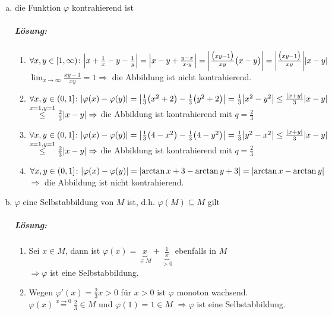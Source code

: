 \documentclass{scrreprt}
\begin{document}
\begin{enumerate}[a)]
\item die Funktion $\varphi$ kontrahierend ist

  \subparagraph{Lösung:}
  \begin{enumerate}[(1)]
  \label{sec:1_a_1}
  \item $\forall x, y \in [1, \infty) \colon \abs{x + \frac{1}{x} - y - \frac{1}{y}}
    = \abs{x - y + \frac{y - x}{x \cdot y}}
    = \abs{\frac{\qty\big(xy - 1)}{xy} \qty\big(x - y)}
    = \abs{\frac{\qty\big(xy - 1)}{xy}} \abs{x - y}$
    $\lim_{x \to \infty}\frac{xy - 1}{xy} = 1 \Rightarrow$ die Abbildung ist nicht kontrahierend.

  \item $\forall x, y \in (0, 1] \colon \abs{\varphi(x) - \varphi(y)}
    = \abs{\frac{1}{3}\qty\big(x^2 + 2) - \frac{1}{3}\qty\big(y^2 + 2)}
    = \frac{1}{3}\abs{x^2 - y^2}
    \leq \frac{\abs{x + y}}{3}\abs{x - y}$
    $\overset{x = 1, y = 1} \leq \frac{2}{3}\abs{x - y}
    \Rightarrow$ die Abbildung ist kontrahierend mit
    $q = \frac{2}{3}$

  \label{sec:1_a_3}
  \item $\forall x, y \in (0, 1] \colon \abs{\varphi(x) - \varphi(y)}
    = \abs{\frac{1}{3}\qty\big(4 - x^2) - \frac{1}{3}\qty\big(4 - y^2)}
    = \frac{1}{3}\abs{y^2 - x^2}
    \leq \frac{\abs{x + y}}{3}\abs{x - y}$
    $\overset{x = 1, y = 1} \leq \frac{2}{3}\abs{x - y}
    \Rightarrow$ die Abbildung ist kontrahierend mit
    $q = \frac{2}{3}$

  \label{sec:1_a_4}
  \item $\forall x, y \in (0, 1] \colon \abs{\varphi(x) - \varphi(y)}
    = \abs{\arctan x + 3 - \arctan y + 3} = \abs{\arctan x - \arctan y}$
    $\Rightarrow$ die Abbildung ist nicht kontrahierend.
  \end{enumerate}

\item $\varphi$ eine Selbstabbildung von $M$ ist, d.h. $\varphi(M) \subseteq M$ gilt

  \subparagraph{Lösung:}
  \begin{enumerate}[(1)]
  \item Sei $x \in M$, dann ist
    $\varphi(x) = \underset{\in M}{\underbrace{x}} + \underset{> 0}{\underbrace{\frac{1}{x}}}$
    ebenfalls in $M$ \\
    $\Rightarrow \varphi$ ist eine Selbstabbildung.

  \item Wegen $\varphi'(x) = \frac{2}{3}x > 0$ für $x > 0$ ist $\varphi$ monoton wachsend.
    $\varphi(x) \overset{x \to 0}= \frac{2}{3} \in M$ und $\varphi(1) = 1 \in M$
    $\Rightarrow \varphi$ ist eine Selbstabbildung.


\end{enumerate}
\end{enumerate}
\end{document}
